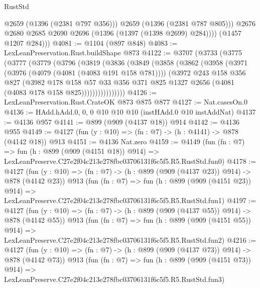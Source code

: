 \begin{lexlean}{RustStd}
\begin{coremodule}
                @2659
                (@1396 (@2381 @797 @356)))
              @2659
              (@1396 (@2381 @787 @805)))
            @2676
            @2680
            @2685
            @2690
            @2696
            (@1396 (@1397 (@1398 @2699) @284))))
        (@1457 @1207 @284)))
@4081 := @1104 (@897 @848)
@4083 := LexLeanPreservation.Rust.buildShape @873
@4122 := @3707
    (@3733
      (@3775
        (@3777
          (@3779
            (@3796
              (@3819
                (@3836
                  (@3849
                    (@3858
                      (@3862
                        (@3958
                          (@3971
                            (@3976 (@4079 (@4081 (@4083 @191 @158 @781))))
                            (@3972
                              @243
                              @158
                              @356
                              @827
                              (@3982
                                @178
                                @158
                                @57
                                @33
                                @356
                                @371
                                @825
                                @1327
                                @2656
                                (@4081 (@4083 @178 @158 @825))))))))))))))))
@4126 := LexLeanPreservation.Rust.CrateOK @873 @875 @877
@4127 := Nat.casesOn.{0}
@4136 := HAdd.hAdd.{0, 0, 0} @10 @10 @10 (instHAdd.{0} @10 instAddNat)
@4137 := @4136 @957
@4141 := @899 (@909 (@4137 @18)) @914
@4142 := @4136 @955
@4149 := @4127 (fun (y : @10) => (fn : @7) -> (h : @4141) -> @878 (@4142 @18)) @913
@4151 := @4136 Nat.zero
@4159 := @4149
    (fun (fn : @7) =>
    fun (h : @899 (@909 (@4151 @18)) @914) =>
    LexLeanPreserve.C27e2f04c213e278fbc03706131f6c5f5.R5.RustStd.fun0)
@4178 := @4127
    (fun (y : @10) => (fn : @7) -> (h : @899 (@909 (@4137 @23)) @914) -> @878 (@4142 @23))
    @913
    (fun (fn : @7) =>
    fun (h : @899 (@909 (@4151 @23)) @914) =>
    LexLeanPreserve.C27e2f04c213e278fbc03706131f6c5f5.R5.RustStd.fun1)
@4197 := @4127
    (fun (y : @10) => (fn : @7) -> (h : @899 (@909 (@4137 @55)) @914) -> @878 (@4142 @55))
    @913
    (fun (fn : @7) =>
    fun (h : @899 (@909 (@4151 @55)) @914) =>
    LexLeanPreserve.C27e2f04c213e278fbc03706131f6c5f5.R5.RustStd.fun2)
@4216 := @4127
    (fun (y : @10) => (fn : @7) -> (h : @899 (@909 (@4137 @73)) @914) -> @878 (@4142 @73))
    @913
    (fun (fn : @7) =>
    fun (h : @899 (@909 (@4151 @73)) @914) =>
    LexLeanPreserve.C27e2f04c213e278fbc03706131f6c5f5.R5.RustStd.fun3)

\end{coremodule}
\end{lexlean}
